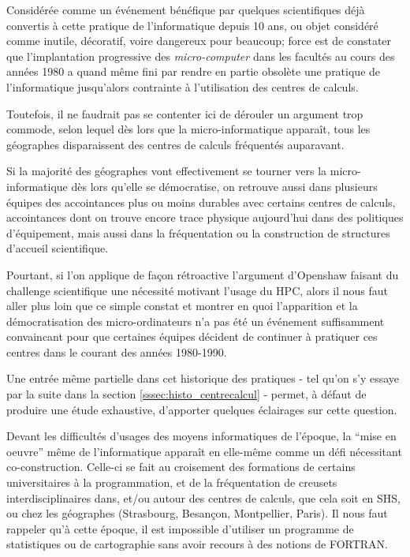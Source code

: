 Considérée comme un événement bénéfique par quelques scientifiques déjà convertis à cette pratique de l'informatique depuis 10 ans, ou objet considéré comme inutile, décoratif, voire dangereux pour beaucoup; force est de constater que l'implantation progressive des \textit{micro-computer} dans les facultés au cours des années 1980 a quand même fini par rendre en partie obsolète une pratique de l’informatique jusqu'alors contrainte à l'utilisation des centres de calculs.

Toutefois, il ne faudrait pas se contenter ici de dérouler un argument trop commode, selon lequel dès lors que la micro-informatique apparaît, tous les géographes disparaissent des centres de calculs fréquentés auparavant.

Si la majorité des géographes vont effectivement se tourner vers la micro-informatique dès lors qu'elle se démocratise, on retrouve aussi dans plusieurs équipes des accointances plus ou moins durables avec certains centres de calculs, accointances dont on trouve encore trace physique aujourd'hui dans des politiques d'équipement, mais aussi dans la fréquentation ou la construction de structures d'accueil scientifique.

Pourtant, si l'on applique de façon rétroactive l'argument d'Openshaw faisant du challenge scientifique une nécessité motivant l'usage du HPC, alors il nous faut aller plus loin que ce simple constat et montrer en quoi l'apparition et la démocratisation des micro-ordinateurs n'a pas été un événement suffisamment convaincant pour que certaines équipes décident de continuer à pratiquer ces centres dans le courant des années 1980-1990.

Une entrée même partielle dans cet historique des pratiques - tel qu'on s'y essaye par la suite dans la section \ref{sssec:histo_centrecalcul} - permet, à défaut de produire une étude exhaustive, d'apporter quelques éclairages sur cette question.

Devant les difficultés d'usages des moyens informatiques de l'époque, la \enquote{mise en oeuvre} même de l'informatique apparaît en elle-même comme un défi nécessitant co-construction. Celle-ci se fait au croisement des formations de certains universitaires à la programmation, et de la fréquentation de creusets interdisciplinaires dans, et/ou autour des centres de calculs, que cela soit en SHS, ou chez les géographes (Strasbourg, Besançon, Montpellier, Paris). Il nous faut rappeler qu'à cette époque, il est impossible d'utiliser un programme de statistiques ou de cartographie sans avoir recours à des notions de FORTRAN.

